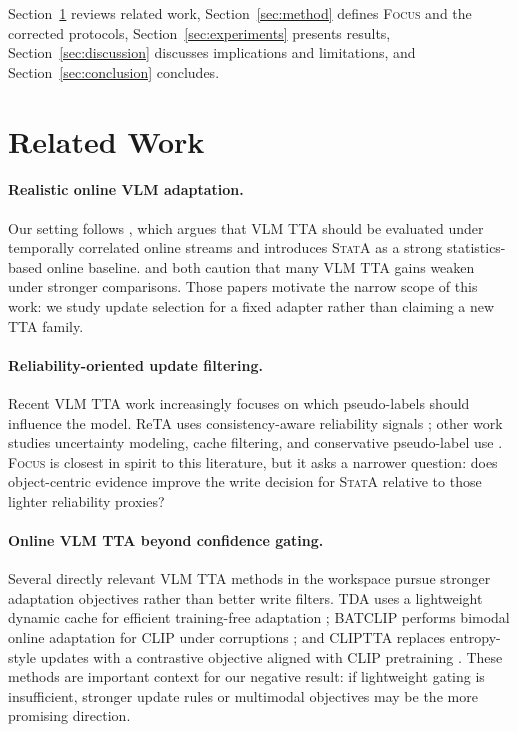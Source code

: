 \documentclass{article}
\newcommand{\focus}{\textsc{Focus}}
\newcommand{\stata}{\textsc{StatA}}
\begin{document}
Section~\ref{sec:related} reviews related work, Section~\ref{sec:method} defines \focus{} and the corrected protocols, Section~\ref{sec:experiments} presents results, Section~\ref{sec:discussion} discusses implications and limitations, and Section~\ref{sec:conclusion} concludes.

\section{Related Work}
\label{sec:related}

\paragraph{Realistic online VLM adaptation.}
Our setting follows \citet{zanella2025realistic}, which argues that VLM TTA should be evaluated under temporally correlated online streams and introduces \stata{} as a strong statistics-based online baseline. \citet{dobler2024lost} and \citet{sheng2025illusion} both caution that many VLM TTA gains weaken under stronger comparisons. Those papers motivate the narrow scope of this work: we study update selection for a fixed adapter rather than claiming a new TTA family.

\paragraph{Reliability-oriented update filtering.}
Recent VLM TTA work increasingly focuses on which pseudo-labels should influence the model. ReTA uses consistency-aware reliability signals \citep{liang2025advancing}; other work studies uncertainty modeling, cache filtering, and conservative pseudo-label use \citep{zhou2025bayesian, nguyen2025adaptive, zhai2025mitigating}. \focus{} is closest in spirit to this literature, but it asks a narrower question: does object-centric evidence improve the write decision for \stata{} relative to those lighter reliability proxies?

\paragraph{Online VLM TTA beyond confidence gating.}
Several directly relevant VLM TTA methods in the workspace pursue stronger adaptation objectives rather than better write filters. TDA uses a lightweight dynamic cache for efficient training-free adaptation \citep{karmanov2024efficient}; BATCLIP performs bimodal online adaptation for CLIP under corruptions \citep{maharana2025batclip}; and CLIPTTA replaces entropy-style updates with a contrastive objective aligned with CLIP pretraining \citep{lafon2025cliptta}. These methods are important context for our negative result: if lightweight gating is insufficient, stronger update rules or multimodal objectives may be the more promising direction.
\end{document}
